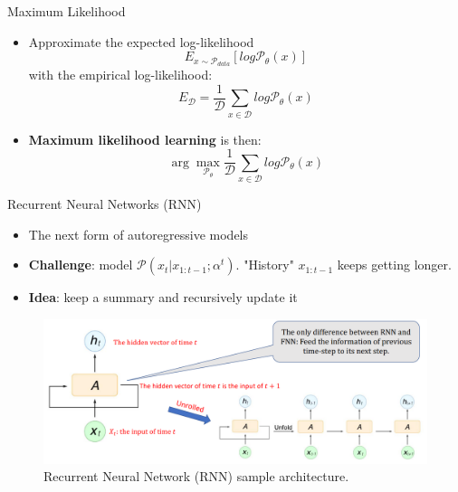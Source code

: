 \begin{frame}{Maximum Likelihood}
\begin{itemize}
    \item Approximate the expected log-likelihood
    $$ E_{x \sim \mathcal{P}_{data}} [log \mathcal{P}_{\theta}(x)]$$
    with the empirical log-likelihood:
    $$E_{\mathcal{D}} = \frac{1}{\mathcal{D}} \sum_{x \in \mathcal{D}} log \mathcal{P}_{\theta}(x)$$
    \item \textbf{Maximum likelihood learning} is then:
        $$\arg\max_{\mathcal{P}_{\theta}} \frac{1}{\mathcal{D}} \sum_{x \in \mathcal{D}} log \mathcal{P}_{\theta}(x)$$
\end{itemize}
\end{frame}

\begin{frame}[allowframebreaks]{Recurrent Neural Networks (RNN)}
\begin{itemize}
    \item The next form of autoregressive models
    \item \textbf{Challenge}: model $\mathcal{P}(x_t|x_{1:t-1}; \alpha^t)$. "History" $x_{1:t-1}$ keeps getting longer.
    \item \textbf{Idea}:  keep a summary and recursively update it
    \end{itemize}

\framebreak
\begin{figure}
    \centering
    \includegraphics[height=0.9\textheight, width=\textwidth, keepaspectratio]{images/autoregressive/rnn_2.png}
    \caption*{Recurrent Neural Network (RNN) sample architecture.}
\end{figure}


\end{frame}
